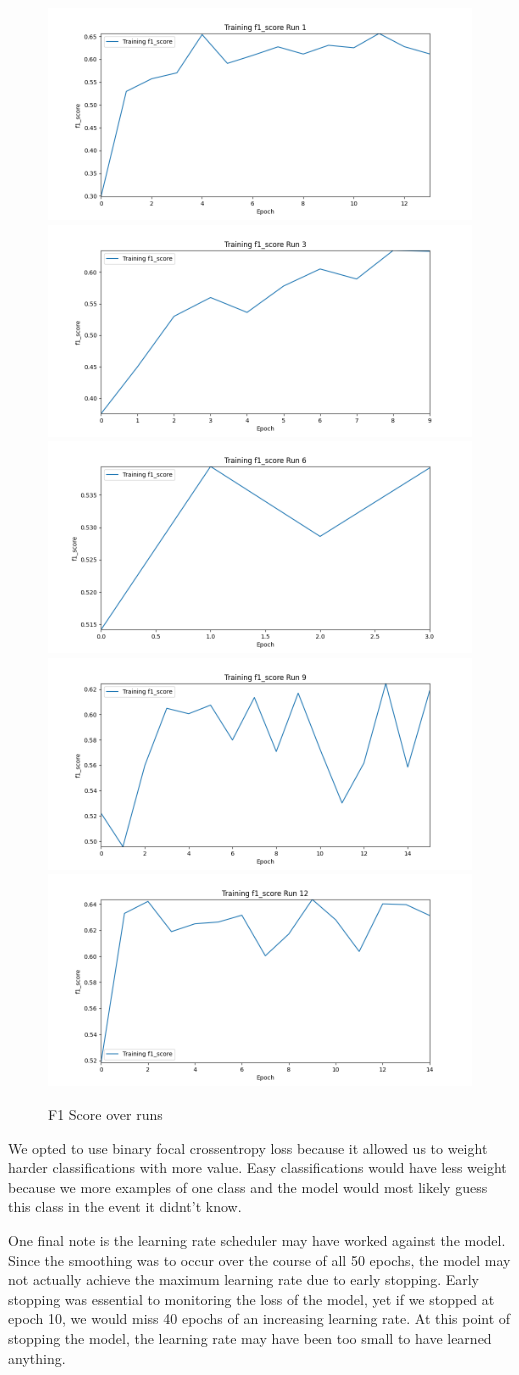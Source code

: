 \begin{figure}[h]
    \centering
    \includegraphics[width=0.30\linewidth]{img/training_f1_score_run_1.png}
    \includegraphics[width=0.30\linewidth]{img/training_f1_score_run_3.png}
    \includegraphics[width=0.30\linewidth]{img/training_f1_score_run_6.png}
    \includegraphics[width=0.30\linewidth]{img/training_f1_score_run_9.png}
    \includegraphics[width=0.30\linewidth]{img/training_f1_score_run_12.png}
    \caption{F1 Score over runs}
    \label{fig:result2}
\end{figure}

We opted to use binary focal crossentropy loss because it allowed us to weight harder 
classifications with more value. Easy classifications would have less weight because we more examples of one class and the model would most likely 
guess this class in the event it didnt't know.

One final note is the learning rate scheduler may have worked against the model. Since the smoothing was to occur over the course of all 50 epochs, the model may not 
actually achieve the maximum learning rate due to early stopping. Early stopping was essential to monitoring the loss of the model, yet if we stopped at epoch 10, we would 
miss 40 epochs of an increasing learning rate. At this point of stopping the model, the learning rate may have been too small to have learned anything.




